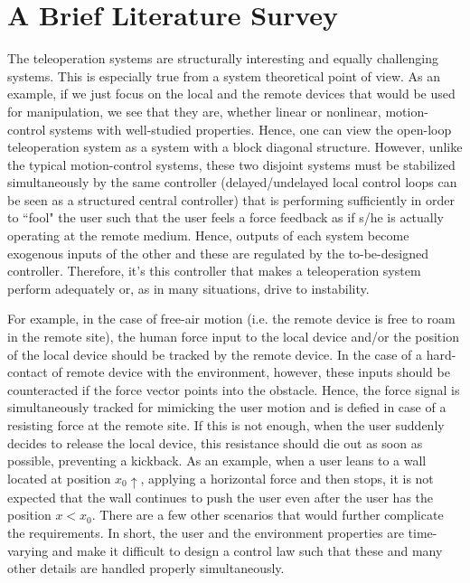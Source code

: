 \chapter{A Brief Literature Survey}\label{chap:litsurvey}

The teleoperation systems are structurally interesting and equally challenging 
systems. This is especially true from a system theoretical point of view. As an example, 
if we just focus on the local and the remote devices that would be used for manipulation, 
we see that they are, whether linear or nonlinear, motion-control systems with well-studied 
properties. Hence, one can view the open-loop teleoperation system as a system with a block 
diagonal structure. However, unlike the typical motion-control systems, these two disjoint systems must be stabilized 
simultaneously by the same controller (delayed/undelayed local control loops can be seen as a structured central
controller) that is performing sufficiently in order to ``fool" the user such that the user feels 
a force feedback as if s/he is actually operating at the remote medium. Hence, outputs of each system become
exogenous inputs of the other and these are regulated by the to-be-designed controller. Therefore, it's this controller 
that makes a teleoperation system perform adequately or, as in many situations, drive to instability.


For example, in the case of free-air motion (i.e. the remote device is free to roam in the remote site), the human force input 
to the local device and/or the position of the local device should be tracked by the remote device. In the case of a 
hard-contact of remote device with the environment, however, these inputs should be counteracted  if the force vector points into 
the obstacle. Hence, the force signal is simultaneously tracked for mimicking the user motion and  
is defied in case of a resisting force at the remote site. If this is not enough, when the user suddenly decides to release the 
local device, this resistance should die out as soon as possible, preventing a kickback. As an example, when a user leans to a wall located at 
position $x_0\!\!\uparrow$, applying a horizontal force and then stops, it is not expected that the wall continues to 
push the user even after the user has the position $x<x_0$. There are a few other scenarios that would further complicate 
the requirements. In short, the user and the environment properties are time-varying and make it difficult to design a control 
law such that these and many other details are handled properly simultaneously. 


